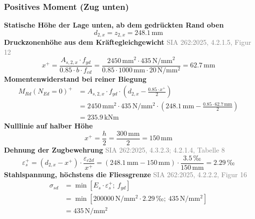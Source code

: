 \documentclass[11pt,a4paper]{article}
\newcommand{\normref}[1]{{\small\textcolor{gray}{#1}}}
\begin{document}
\subsubsection{Positives Moment (Zug unten)}
\noindent\textbf{Statische Höhe der Lage unten, ab dem gedrückten Rand oben}
\begin{equation*}
d_{2,x} = z_{2,x} = 248.1\,\mathrm{mm}
\end{equation*}
\noindent\textbf{Druckzonenhöhe aus dem Kräftegleichgewicht} \hfill \normref{SIA 262:2025, 4.2.1.5, Figur 12}
\begin{equation*}
x^{+} = \frac{A_{s,2,x} \cdot f_{yd}}{0.85 \cdot b \cdot f_{cd}} = \frac{2450\,\mathrm{mm}^{2} \cdot 435\,\mathrm{N}/\mathrm{mm}^{2}}{0.85 \cdot 1000\,\mathrm{mm} \cdot 20\,\mathrm{N}/\mathrm{mm}^{2}} = 62.7\,\mathrm{mm}
\end{equation*}
\noindent\textbf{Momentenwiderstand bei reiner Biegung}
\begin{equation*}
\begin{aligned}
  M_{Rd}(N_{Ed}=0)^{+} &= A_{s,2,x} \cdot f_{yd} \cdot \left(d_{2,x} - \frac{0.85 \cdot x^{+}}{2}\right) \\
  &= 2450\,\mathrm{mm}^{2} \cdot 435\,\mathrm{N}/\mathrm{mm}^{2} \cdot \left(248.1\,\mathrm{mm} - \frac{0.85 \cdot 62.7\,\mathrm{mm}}{2}\right) \\
  &= 235.9\,\mathrm{kNm}
\end{aligned}
\end{equation*}
\noindent\textbf{Nulllinie auf halber Höhe}
\begin{equation*}
x^{+} = \frac{h}{2} = \frac{300\,\mathrm{mm}}{2} = 150\,\mathrm{mm}
\end{equation*}
\noindent\textbf{Dehnung der Zugbewehrung} \hfill \normref{SIA 262:2025, 4.3.2.3; 4.2.1.4, Tabelle 8}
\begin{equation*}
\varepsilon_s^{+} = \left(d_{2,x} - x^{+}\right) \cdot \frac{\varepsilon_{c2d}}{x^{+}} = \left(248.1\,\mathrm{mm} - 150\,\mathrm{mm}\right) \cdot \frac{3.5\,\text{‰}}{150\,\mathrm{mm}} = 2.29\,\text{‰}
\end{equation*}
\noindent\textbf{Stahlspannung, höchstens die Fliessgrenze} \hfill \normref{SIA 262:2025, 4.2.2.2, Figur 16}
\begin{equation*}
\begin{aligned}
  \sigma_{sd} &= \min\left[E_s \cdot \varepsilon_s^{+};\ f_{yd}\right] \\
  &= \min\left[200000\,\mathrm{N}/\mathrm{mm}^{2} \cdot 2.29\,\text{‰};\ 435\,\mathrm{N}/\mathrm{mm}^{2}\right] \\
  &= 435\,\mathrm{N}/\mathrm{mm}^{2}
\end{aligned}
\end{equation*}
\end{document}

